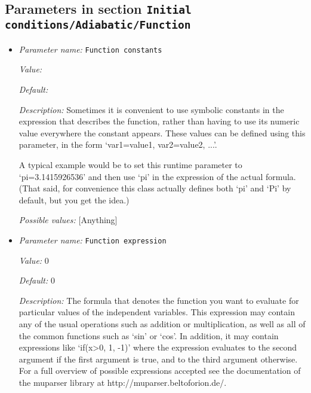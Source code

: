 \subsection{Parameters in section \tt Initial conditions/Adiabatic/Function}
\label{parameters:Initial_20conditions/Adiabatic/Function}

\begin{itemize}
\item {\it Parameter name:} {\tt Function constants}
\label{parameters:Initial conditions/Adiabatic/Function/Function constants}


{\it Value:} 


{\it Default:} 


{\it Description:} Sometimes it is convenient to use symbolic constants in the expression that describes the function, rather than having to use its numeric value everywhere the constant appears. These values can be defined using this parameter, in the form `var1=value1, var2=value2, ...'.

A typical example would be to set this runtime parameter to `pi=3.1415926536' and then use `pi' in the expression of the actual formula. (That said, for convenience this class actually defines both `pi' and `Pi' by default, but you get the idea.)


{\it Possible values:} [Anything]
\item {\it Parameter name:} {\tt Function expression}
\label{parameters:Initial conditions/Adiabatic/Function/Function expression}


{\it Value:} 0


{\it Default:} 0


{\it Description:} The formula that denotes the function you want to evaluate for particular values of the independent variables. This expression may contain any of the usual operations such as addition or multiplication, as well as all of the common functions such as `sin' or `cos'. In addition, it may contain expressions like `if(x>0, 1, -1)' where the expression evaluates to the second argument if the first argument is true, and to the third argument otherwise. For a full overview of possible expressions accepted see the documentation of the muparser library at http://muparser.beltoforion.de/.


\end{itemize}
